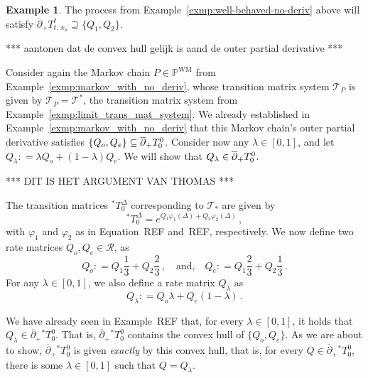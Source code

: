 \documentclass[10pt,a4paper]{paper}
\theoremstyle{definition}
\newtheorem{exmp}{Example}%
\newcommand{\processes}{\mathbb{P}}
\newcommand{\wmprocesses}{\processes^{\mathrm{WM}}}
\newcommand{\coloneqq}{:\!=}
\begin{document}
\begin{exmp}
The process from Example~\ref{exmp:well-behaved-no-deriv} above will satisfy $\overline{\partial}_{+}
{T^t_{t,\,x_u}}\supseteq \{Q_1,Q_2\}$.

*** aantonen dat de convex hull gelijk is aand de outer partial derivative ***

Consider again the Markov chain $P\in\wmprocesses$ from Example~\ref{exmp:markov_with_no_deriv}, whose transition matrix system $\mathcal{T}_P$ is given by $\mathcal{T}_P=\mathcal{T}^*$, the transition matrix system from Example~\ref{exmp:limit_trans_mat_system}. We already established in Example~\ref{exmp:markov_with_no_deriv} that this Markov chain's outer partial derivative satisfies $\{Q_o,Q_e\}\subseteq \smash{\overline{\partial}}_+T_0^0$. Consider now any $\lambda\in[0,1]$, and let $Q_\lambda\coloneqq \lambda Q_o + (1-\lambda)Q_e$. We will show that $Q_\lambda \in \smash{\overline{\partial}}_+T_0^0$.

 *** DIT IS HET ARGUMENT VAN THOMAS ***

 The transition matrices ${}^*T_0^\Delta$ corresponding to $\mathcal{T}_*$ are given by
\begin{equation*}
{}^*T_0^\Delta = e^{Q_1\varphi_1(\Delta) + Q_2\varphi_2(\Delta)}\,,
\end{equation*}
with $\varphi_1$ and $\varphi_2$ as in Equation~REF and~REF, respectively. We now define two rate matrices $Q_o,Q_e\in\mathcal{R}$, as
\begin{equation*}
Q_o \coloneqq Q_1\frac{1}{3} + Q_2\frac{2}{3}\,,\quad\text{and,}\quad Q_e\coloneqq Q_1\frac{2}{3} + Q_2\frac{1}{3}\,.
\end{equation*}
For any $\lambda\in[0,1]$, we also define a rate matrix $Q_\lambda$ as
\begin{equation*}
Q_\lambda \coloneqq Q_o\lambda + Q_e(1-\lambda)\,.
\end{equation*}

We have already seen in Example~REF that, for every $\lambda\in[0,1]$, it holds that $Q_\lambda\in\overline{\partial}_+{}^*T_0^0$. That is, $\overline{\partial}_+{}^*T_0^0$ contains the convex hull of $\{Q_o,Q_e\}$. As we are about to show, $\overline{\partial}_+{}^*T_0^0$ is given \emph{exactly} by this convex hull, that is, for every $Q\in\overline{\partial}_+{}^*T_0^0$, there is some $\lambda\in[0,1]$ such that $Q=Q_\lambda$.


\end{exmp}
\end{document}

